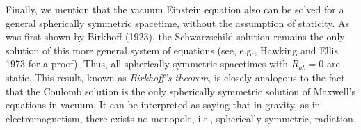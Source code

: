 Finally, we mention that the vacuum Einstein equation also can be solved for a
general spherically symmetric spacetime, without the assumption of staticity. As
was first shown by Birkhoff (1923), the Schwarzschild solution remains the only
solution of this more general system of equations (see, e.g., Hawking and Ellis
1973 for a proof). Thus, all spherically symmetric spacetimes with \(R_{ab}=0\)
are static. This result, known as \emph{Birkhoff's theorem}, is closely analogous
to the fact that the Coulomb solution is the only spherically symmetric solution
of Maxwell's equations in vacuum. It can be interpreted as saying that in gravity,
as in electromagnetism, there exists no monopole, i.e., spherically symmetric,
radiation.
